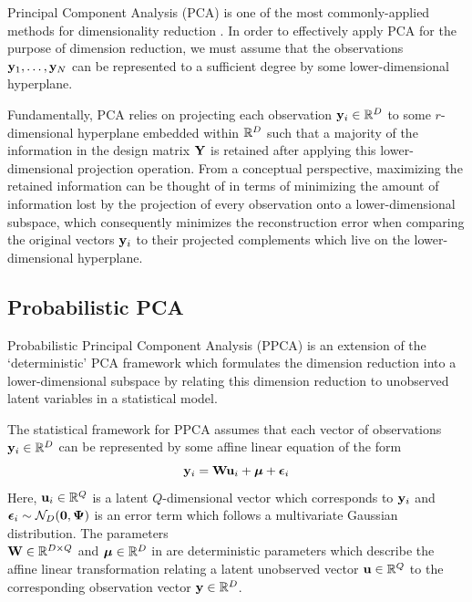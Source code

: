 \documentclass[12pt]{article}
\numberwithin{equation}{section}
\numberwithin{figure}{section}
\numberwithin{table}{section}
\begin{document}
Principal Component Analysis (PCA) is one of the most commonly-applied methods for dimensionality reduction \citep{PPCA-1999}. In order to effectively apply PCA for the purpose of dimension reduction, we must assume that the observations $\mathbf{y}_{1}, \dots, \mathbf{y}_{N}$ can be represented to a sufficient degree by some lower-dimensional hyperplane. 

Fundamentally, PCA relies on projecting each observation $\mathbf{y}_{i} \in \mathbb{R}^{D}$ to some $r$-dimensional hyperplane embedded within $\mathbb{R}^{D}$ such that a majority of the information in the design matrix $\mathbf{Y}$ is retained after applying this lower-dimensional projection operation. From a conceptual perspective, maximizing the retained information can be thought of in terms of minimizing the amount of information lost by the projection of every observation onto a lower-dimensional subspace, which consequently minimizes the reconstruction error when comparing the original vectors $\mathbf{y}_{i}$ to their projected complements which live on the lower-dimensional hyperplane. 

\subsection{Probabilistic PCA}

Probabilistic Principal Component Analysis (PPCA) is an extension of the `deterministic' PCA framework which formulates the dimension reduction into a lower-dimensional subspace by relating this dimension reduction to unobserved latent variables in a statistical model. \citep{PPCA-1999,GPLVM-Viz-2004}

The statistical framework for PPCA assumes that each vector of observations $\mathbf{y}_{i} \in \mathbb{R}^{D}$ can be represented by some affine linear equation of the form 
\begin{equation}
    \label{eq:PPCA-framework}
    \mathbf{y}_{i} = \mathbf{W}\mathbf{u}_{i} + \bm{\mu} + \bm{\epsilon}_{i}
\end{equation} 
Here, $\mathbf{u}_{i} \in \mathbb{R}^{Q}$ is a latent $Q$-dimensional vector which corresponds to $\mathbf{y}_{i}$ and $\bm{\epsilon}_{i} \sim \mathcal{N}_{D}(\bm{0}, \bm{\Psi})$ is an error term which follows a multivariate Gaussian distribution. The parameters\\ $\mathbf{W} \in \mathbb{R}^{D \times Q}$ and $\bm{\mu} \in \mathbb{R}^{D}$ in  are deterministic parameters which describe the affine linear transformation relating a latent unobserved vector $\mathbf{u} \in \mathbb{R}^{Q}$ to the corresponding observation vector $\mathbf{y} \in \mathbb{R}^{D}$. 
\end{document}

